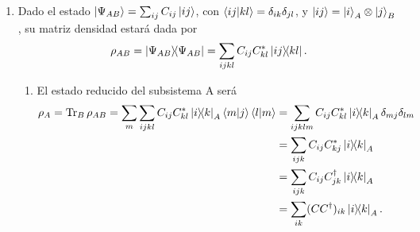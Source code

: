 \documentclass{scrartcl}
\DeclareRobustCommand{\[}{\begin{equation}}
\DeclareRobustCommand{\]}{\end{equation}}
\begin{document}
\begin{enumerate}
    
    
    \item Dado el estado $\ket{\Psi_{AB}} = \sum_{ij} C_{ij} \ket{ij}$, con $\ip{ij}{kl} = \delta_{ik} \delta_{jl}$, y $\ket{ij} = \ket{i}_A \otimes \ket{j}_B$, su matriz densidad estará dada por
    \[ \rho_{AB} = \dyad{\Psi_{AB}}{\Psi_{AB}} = \sum_{ijkl} C_{ij} C_{kl}^* \dyad{ij}{kl}. \]
    \begin{enumerate}
        \item El estado reducido del subsistema A será
        \begin{align}
            \rho_A = \Tr_B \rho_{AB} = \sum_{m} \sum_{ijkl} C_{ij} C_{kl}^* \dyad{i}{k}_A \bra{m}\ket{j}\bra{l}\ket{m} &= \sum_{ijklm} C_{ij} C_{kl}^* \dyad{i}{k}_A \delta_{mj} \delta_{lm} \\
                &= \sum_{ijk} C_{ij} C_{kj}^* \dyad{i}{k}_A \\
                &= \sum_{ijk} C_{ij} C_{jk}^\dagger \dyad{i}{k}_A \\
                &= \sum_{ik} (CC^\dagger)_{ik} \dyad{i}{k}_A.
        \end{align}
        

\end{enumerate}
\end{enumerate}
\end{document}
